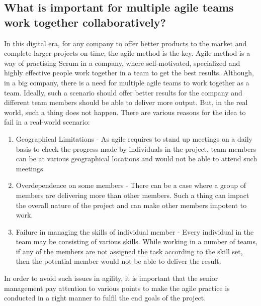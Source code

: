 \documentclass[sigplan,screen]{acmart}
\begin{document}
\subsection{What is important for multiple agile teams work together collaboratively?}
In this digital era, for any company to offer better products to the market and complete larger projects on time; the agile method is the key. Agile method is a way of practising Scrum in a company, where self-motivated, specialized and highly effective people work together in a team to get the best results. Although, in a big company, there is a need for multiple agile teams to work together as a team. Ideally, such a scenario should offer better results for the company and different team members should be able to deliver more output. But, in the real world, such a thing does not happen. There are various reasons for the idea to fail in a real-world scenario:
\begin{enumerate}
\item Geographical Limitations \cite{Cross18} - As agile requires to stand up meetings on a daily basis to check the progress made by individuals in the project, team members can be at various geographical locations and would not be able to attend such meetings.
\item Overdependence on some members \cite{Cross18} - There can be a case where a group of members are delivering more than other members. Such a thing can impact the overall nature of the project and can make other members impotent to work.
\item Failure in managing the skills of individual member \cite{Cross18} - Every individual in the team may be consisting of various skills. While working in a number of teams, if any of the members are not assigned the task according to the skill set, then the potential member would not be able to deliver the result.
\end{enumerate}
In order to avoid such issues in agility, it is important that the senior management pay attention to various points to make the agile practice is conducted in a right manner to fulfil the end goals of the project.
\end{document}
